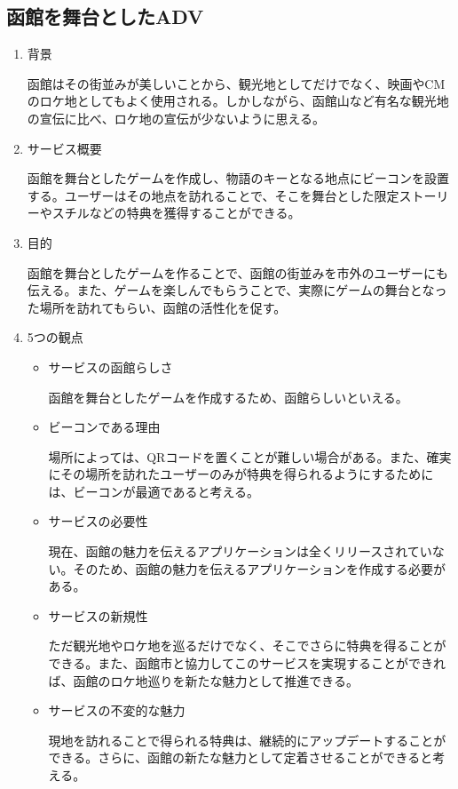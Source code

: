 \subsection{函館を舞台としたADV}
\begin{enumerate}
    \item 背景
    \par 函館はその街並みが美しいことから、観光地としてだけでなく、映画やCMのロケ地としてもよく使用される。しかしながら、函館山など有名な観光地の宣伝に比べ、ロケ地の宣伝が少ないように思える。
    \item サービス概要
    \par 函館を舞台としたゲームを作成し、物語のキーとなる地点にビーコンを設置する。ユーザーはその地点を訪れることで、そこを舞台とした限定ストーリーやスチルなどの特典を獲得することができる。
    \item 目的
    \par 函館を舞台としたゲームを作ることで、函館の街並みを市外のユーザーにも伝える。また、ゲームを楽しんでもらうことで、実際にゲームの舞台となった場所を訪れてもらい、函館の活性化を促す。
    \item 5つの観点
    \begin{itemize}
        \item サービスの函館らしさ
        \par 函館を舞台としたゲームを作成するため、函館らしいといえる。
        \item ビーコンである理由
        \par 場所によっては、QRコードを置くことが難しい場合がある。また、確実にその場所を訪れたユーザーのみが特典を得られるようにするためには、ビーコンが最適であると考える。
        \item サービスの必要性
        \par 現在、函館の魅力を伝えるアプリケーションは全くリリースされていない。そのため、函館の魅力を伝えるアプリケーションを作成する必要がある。
        \item サービスの新規性
        \par ただ観光地やロケ地を巡るだけでなく、そこでさらに特典を得ることができる。また、函館市と協力してこのサービスを実現することができれば、函館のロケ地巡りを新たな魅力として推進できる。
        \item サービスの不変的な魅力
        \par 現地を訪れることで得られる特典は、継続的にアップデートすることができる。さらに、函館の新たな魅力として定着させることができると考える。
    \end{itemize}
\end{enumerate}

